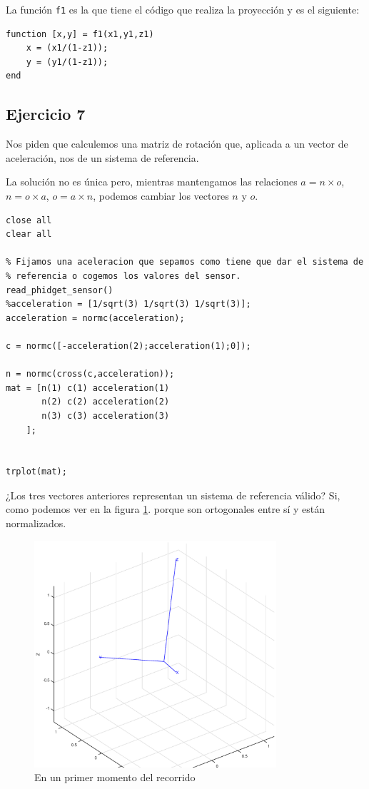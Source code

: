 \documentclass{article}
\newcommand{\fref}[1]{figura \ref{fig:#1}}
\newcommand{\sej}[1]{\subsection{Ejercicio #1}}
\begin{document}
La función {\tt f1} es la que tiene el código que realiza la proyección y es el siguiente:

\begin{lstlisting}[frame=single]
function [x,y] = f1(x1,y1,z1)
    x = (x1/(1-z1));
    y = (y1/(1-z1));
end
\end{lstlisting}

\sej{7}

Nos piden que calculemos una matriz de rotación que, aplicada a un vector de aceleración, nos de un sistema de referencia.

La solución no es única pero, mientras mantengamos las relaciones $a = n \times o$, $n = o \times a$, $o = a \times n$, podemos cambiar los vectores $n$ y $o$.

\begin{lstlisting}[frame=single]
close all
clear all

% Fijamos una aceleracion que sepamos como tiene que dar el sistema de 
% referencia o cogemos los valores del sensor.
read_phidget_sensor()
%acceleration = [1/sqrt(3) 1/sqrt(3) 1/sqrt(3)];
acceleration = normc(acceleration);

c = normc([-acceleration(2);acceleration(1);0]);

n = normc(cross(c,acceleration));
mat = [n(1) c(1) acceleration(1)
       n(2) c(2) acceleration(2)
       n(3) c(3) acceleration(3)
    ];


trplot(mat);
\end{lstlisting}

¿Los tres vectores anteriores representan un sistema de referencia válido? Si, como podemos ver en la \fref{practica2_ex7}. porque son ortogonales entre sí y están normalizados.

\begin{figure}[h]
\centering
\includegraphics[width=0.8\textwidth]{practica2_ex7.eps}
\caption{En un primer momento del recorrido}
\label{fig:practica2_ex7}
\end{figure}
\end{document}
